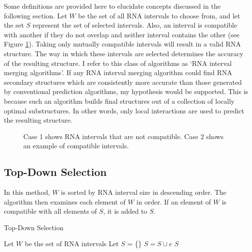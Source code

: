 \documentclass{cshonours}
\begin{document}
Some definitions are provided here to elucidate concepts discussed in the following section. Let $W$ be the set of all RNA intervals to choose from, and let the set $S$ represent the set of selected intervals. Also, an interval is compatible with another if they do not overlap and neither interval contains the other (see Figure \ref{fig:compatible}). Taking only mutually compatible intervals will result in a valid RNA  structure. The way in which these intervals are selected determines the accuracy of the resulting structure. I refer to this class of algorithms as `RNA interval merging algorithms'. If any RNA interval merging algorithm could find RNA secondary structures which are consistently more accurate than those generated by conventional prediction algorithms, my hypothesis would be supported. This is because such an algorithm builds final structures out of a collection of locally optimal substructures. In other words, only local interactions are used to predict the resulting structure.

\begin{figure}
\begin{center}
\end{center}
\caption{Case 1 shows RNA intervals that are not compatible. Case 2 shows an example of compatible intervals.}
\label{fig:compatible}
\end{figure}


\subsection{Top-Down Selection}
In this method, $W$ is sorted by RNA interval size in descending order. The algorithm then examines each element of $W$ in order. If an element of $W$ is compatible with all elements of $S$, it is added to $S$.

\begin{algorithm}
  \caption{Top-Down Selection}
  \label{tds}
  \begin{algorithmic}[1]
  \State Let $W$ be the set of RNA intervals
  \State Let $S$ = \{\}
  \State {}
  		\State $S = S \cup e$
  	\EndIf
  \EndFor
  \State \Return $S$
  \end{algorithmic}
\end{algorithm}
\end{document}
